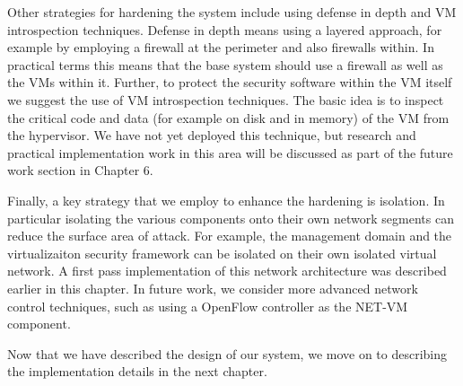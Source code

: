 Other strategies for hardening the system include using defense in depth and VM introspection techniques. Defense in depth means using a layered approach, for example by employing a firewall at the perimeter and also firewalls within. In practical terms this means that the base system should use a firewall as well as the VMs within it. Further, to protect the security software within the VM itself we suggest the use of VM introspection techniques. The basic idea is to inspect the critical code and data (for example on disk and in memory) of the VM from the hypervisor. We have not yet deployed this technique, but research and practical implementation work in this area will be discussed as part of the future work section in Chapter 6.

Finally, a key strategy that we employ to enhance the hardening is isolation. In particular isolating the various components onto their own network segments can reduce the surface area of attack. For example, the management domain and the virtualizaiton security framework can be isolated on their own isolated virtual network. A first pass implementation of this network architecture was described earlier in this chapter. In future work, we consider more advanced network control techniques, such as using a OpenFlow controller as the NET-VM component.

Now that we have described the design of our system, we move on to describing the implementation details in the next chapter.

